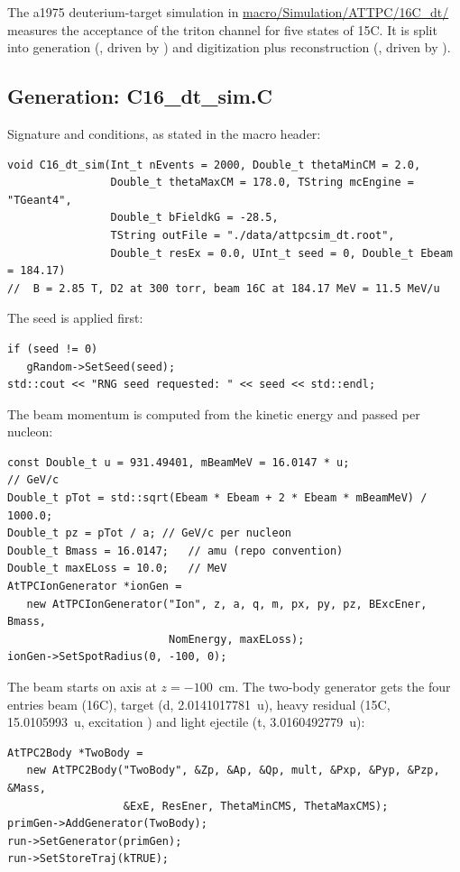 The a1975 deuterium-target simulation in \url{macro/Simulation/ATTPC/16C_dt/} measures the
acceptance of the triton channel for five states of 15C. It is split into generation
(, driven by ) and digitization plus reconstruction
(, driven by ).

\subsection{Generation: C16\_dt\_sim.C}

Signature and conditions, as stated in the macro header:

\begin{verbatim}
void C16_dt_sim(Int_t nEvents = 2000, Double_t thetaMinCM = 2.0,
                Double_t thetaMaxCM = 178.0, TString mcEngine = "TGeant4",
                Double_t bFieldkG = -28.5,
                TString outFile = "./data/attpcsim_dt.root",
                Double_t resEx = 0.0, UInt_t seed = 0, Double_t Ebeam = 184.17)
//  B = 2.85 T, D2 at 300 torr, beam 16C at 184.17 MeV = 11.5 MeV/u
\end{verbatim}

The seed is applied first:

\begin{verbatim}
if (seed != 0)
   gRandom->SetSeed(seed);
std::cout << "RNG seed requested: " << seed << std::endl;
\end{verbatim}

The beam momentum is computed from the kinetic energy and passed per nucleon:

\begin{verbatim}
const Double_t u = 931.49401, mBeamMeV = 16.0147 * u;
// GeV/c
Double_t pTot = std::sqrt(Ebeam * Ebeam + 2 * Ebeam * mBeamMeV) / 1000.0;
Double_t pz = pTot / a; // GeV/c per nucleon
Double_t Bmass = 16.0147;   // amu (repo convention)
Double_t maxELoss = 10.0;   // MeV
AtTPCIonGenerator *ionGen =
   new AtTPCIonGenerator("Ion", z, a, q, m, px, py, pz, BExcEner, Bmass,
                         NomEnergy, maxELoss);
ionGen->SetSpotRadius(0, -100, 0);
\end{verbatim}

The beam starts on axis at $z=-100$~cm. The two-body generator gets the four entries
beam (16C), target (d, 2.0141017781~u), heavy residual (15C, 15.0105993~u, excitation
) and light ejectile (t, 3.0160492779~u):

\begin{verbatim}
AtTPC2Body *TwoBody =
   new AtTPC2Body("TwoBody", &Zp, &Ap, &Qp, mult, &Pxp, &Pyp, &Pzp, &Mass,
                  &ExE, ResEner, ThetaMinCMS, ThetaMaxCMS);
primGen->AddGenerator(TwoBody);
run->SetGenerator(primGen);
run->SetStoreTraj(kTRUE);
\end{verbatim}

